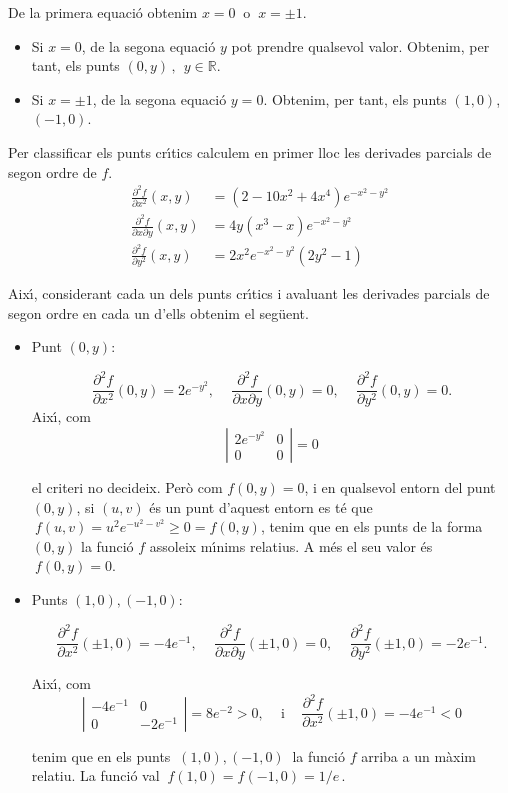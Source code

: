 \documentclass[12pt]{article}
\newcommand{\R}{\mathbb{R}}
\begin{document}
De la primera equaci{\'o} obtenim $ x = 0\ $ o $\ x = \pm 1 $.

\begin{itemize}
\item [] Si $ x = 0 $, de la segona equaci{\'o} $ y $ pot prendre qualsevol
valor. Obtenim, per tant, els punts $ (0, y)\,,\ \ y \in \R $.
\item [] Si $ x = \pm 1 $, de la segona equaci{\'o} $ y = 0 $. Obtenim, per tant,
els punts $ (1,0) $, $ (-1,0) $.
\end{itemize}

Per classificar els punts cr{\'\i}tics calculem en primer lloc les
derivades parcials de segon ordre de $ f $.
\begin{align*}
  \frac{\partial ^ 2 f}{\partial x ^ 2} (x, y) & = (2-10x ^ 2 + 4x ^ 4) e ^{-x ^ 2-y ^ 2} \\
  \frac{\partial ^ 2 f}{\partial x \partial y} (x, y) & = 4y (x ^ 3-x) e ^{-x ^ 2-y ^ 2} \\
  \frac{\partial ^ 2 f}{\partial y ^ 2} (x, y) & = 2x ^ 2 e ^{-x ^ 2-y ^ 2}
   (2y ^ 2-1)
\end{align*}

Aix{\'\i}, considerant cada un dels punts cr{\'\i}tics i avaluant les
derivades parcials de segon ordre en cada un d'ells
obtenim el seg{\"u}ent.

\begin{itemize}
\item [] Punt $ (0, y) $:

\[
\frac{\partial ^ 2 f}{\partial x ^ 2} (0, y) = 2e ^{-y ^ 2}, \, \quad
\frac{\partial ^ 2 f}{\partial x \partial y} (0, y) = 0, \, \quad
\frac{\partial ^ 2 f}{\partial y ^ 2} (0, y) = 0.
\]
Aix{\'\i}, com
\[
\left |
\begin{matrix}
  2e ^{-y ^ 2} & 0 \\  0 & 0
\end{matrix}
\right | = 0
\]

el criteri no decideix. Per{\`o} com $ f (0, y) = 0 $, i en qualsevol
entorn del punt $ (0, y) $, si $ (u, v) $ {\'e}s un punt d'aquest entorn
es t{\'e} que $\ f (u, v) = u ^ 2e ^{-u ^ 2-v ^ 2} \geq 0 = f (0, y) $, tenim que
en els punts de la forma $ (0, y) $ la funci{\'o} $ f $ assoleix m{\'\i}nims
relatius. A m{\'e}s el seu valor {\'e}s $\ f (0, y) = 0 $.

\item [] Punts $ (1,0), (-1,0) $:

\[
\frac{\partial ^ 2 f}{\partial x ^ 2} (\pm 1,0) =- 4 e ^{-1}, \, \quad
\frac{\partial ^ 2 f}{\partial x \partial y} (\pm 1,0) = 0, \, \quad
\frac{\partial ^ 2 f}{\partial y ^ 2} (\pm 1,0) =- 2 e ^{-1}.
\]

Aix{\'\i}, com
\[
\left |
\begin{matrix}
  -4 e ^{-1} & 0 \\
   0 &-2 e ^{-1}
\end{matrix}
\right | = 8e ^{-2} >0, \, \quad \mbox{i} \, \quad \frac{\partial ^ 2
f}{\partial x ^ 2} (\pm 1,0) =- 4 e ^{-1} <0
\]

tenim que en els punts $\ (1,0), (-1,0)\ $ la funci{\'o} $ f $ arriba a un m{\`a}xim
relatiu. La funci{\'o} val $\ f(1,0)=f(-1,0)=1/e\,.$
\end{itemize}
\end{document}

